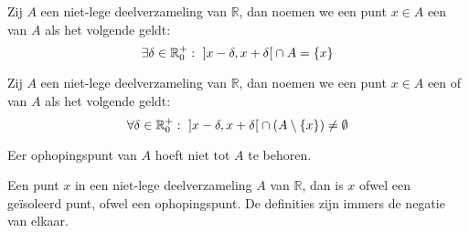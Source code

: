 \documentclass[main.tex]{subfiles}
\begin{document}
\begin{de}
  Zij $A$ een niet-lege deelverzameling van $\mathbb{R}$, dan noemen we een punt $x\in A$ een  van $A$ als het volgende geldt:
  \[ \exists \delta \in \mathbb{R}_{0}^{+}:\ \interval[open]{x-\delta}{x+\delta} \cap A = \{ x \} \]
\end{de}

\begin{de}
  Zij $A$ een niet-lege deelverzameling van $\mathbb{R}$, dan noemen we een punt $x\in A$ een  of  van $A$ als het volgende geldt:
  \[ \forall \delta \in \mathbb{R}_{0}^{+}:\ \interval[open]{x-\delta}{x+\delta} \cap (A \setminus \{x\}) \neq \emptyset \]
\end{de}

\begin{opm}
  Eer ophopingspunt van $A$ hoeft niet tot $A$ te behoren.
\end{opm}

\begin{opm}
  Een punt $x$ in een niet-lege deelverzameling $A$ van $\mathbb{R}$, dan is $x$ ofwel een ge\"isoleerd punt, ofwel een ophopingspunt.
  De definities zijn immers de negatie van elkaar.
\end{opm}
\end{document}
